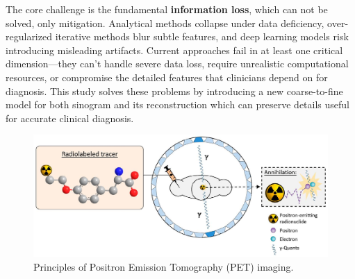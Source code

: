 \documentclass[12pt]{iopart}
\begin{document}
The core challenge is the fundamental \textbf{information loss}, which can not be solved, only mitigation. Analytical methods collapse under data deficiency, over-regularized iterative methods blur subtle features, and deep learning models risk introducing misleading artifacts. Current approaches fail in at least one critical dimension—they can't handle severe data loss, require unrealistic computational resources, or compromise the detailed features that clinicians depend on for diagnosis. 
This study solves these problems by introducing a new coarse-to-fine model for both sinogram and its reconstruction which can preserve details useful for accurate clinical diagnosis.
\begin{figure}[htbp]
	\centering
	\includegraphics[scale=0.60]{./Images/graph.jpg}
	\caption{Principles of Positron Emission Tomography (PET) imaging.}
	\label{fig:graph}
\end{figure}
\end{document}
